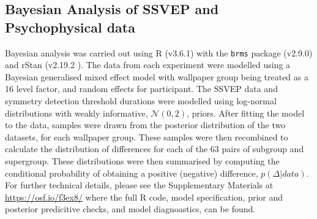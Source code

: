 \documentclass[11pt, twoside]{article}
\begin{document}
\subsection*{Bayesian Analysis of SSVEP and Psychophysical data}
Bayesian analysis was carried out using R (v3.6.1) \cite{R} with the \texttt{brms} package (v2.9.0) \cite{burkner2017} and rStan (v2.19.2 \cite{rStan}). The data from each experiment were modelled using a Bayesian generalised mixed effect model with wallpaper group being treated as a 16 level factor, and random effects for participant. The SSVEP data and symmetry detection threshold durations were modelled using log-normal distributions with weakly informative, $ \mathcal{N}(0, 2)$, priors. After fitting the model to the data, samples were drawn from the posterior distribution of the two datasets, for each wallpaper group. These samples were then recombined to calculate the distribution of differences for each of the 63 pairs of subgroup and supergroup. These distributions were then summarised by computing the conditional probability of obtaining a positive (negative) difference, $p(\Delta | data)$. For further technical details, please see the Supplementary Materials at \url{https://osf.io/f3ex8/} where the full R code, model specification, prior and posterior predicitive checks, and model diagnoastics, can be found. 

\begin{multicols}{2}
\small
 

\end{multicols}
\end{document}
